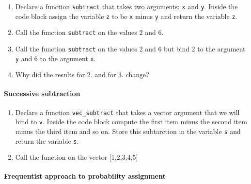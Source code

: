 \begin{enumerate}
\def\labelenumi{\arabic{enumi}.}
\tightlist
\item
  Declare a function \texttt{subtract} that takes two arguments:
  \texttt{x} and \texttt{y}. Inside the code block assign the variable
  \texttt{z} to be \texttt{x} minus \texttt{y} and return the variable
  \texttt{z}.
\item
  Call the function \texttt{subtract} on the values 2 and 6.
\item
  Call the function \texttt{subtract} on the values 2 and 6 but bind 2
  to the argument \texttt{y} and 6 to the argument \texttt{x}.
\item
  Why did the results for 2. and for 3. change?
\end{enumerate}

\hypertarget{successive-subtraction}{%
\paragraph{Successive subtraction}\label{successive-subtraction}}

\begin{enumerate}
\def\labelenumi{\arabic{enumi}.}
\tightlist
\item
  Declare a function \texttt{vec\_subtract} that takes a vector argument
  that we will bind to \texttt{v}. Inside the code block compute the
  first item minus the second item minus the third item and so on. Store
  this subtarction in the variable \texttt{s} and return the variable
  \texttt{s}.
\item
  Call the function on the vector {[}1,2,3,4,5{]}
\end{enumerate}

\hypertarget{frequentist-approach-to-probability-assignment}{%
\paragraph{Frequentist approach to probability
assignment}\label{frequentist-approach-to-probability-assignment}}

